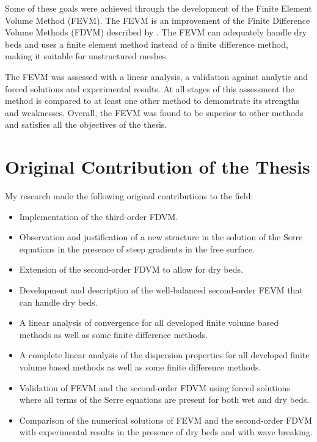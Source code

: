 Some of these goals were achieved through the development of the Finite Element Volume Method (FEVM). The FEVM is an improvement of the Finite Difference Volume Methods (FDVM) described by \citet{Zoppou-2014}. The FEVM can adequately handle dry beds and uses a finite element method instead of a finite difference method, making it suitable for unstructured meshes. 

The FEVM was assessed with a linear analysis, a validation against analytic and forced solutions and experimental results. At all stages of this assessment the method is compared to at least one other method to demonstrate its strengths and weaknesses. Overall, the FEVM was found to be superior to other methods and satisfies all the objectives of the thesis.

\section{Original Contribution of the Thesis}
My research made the following original contributions to the field:
\begin{itemize}
	\item Implementation of the third-order FDVM.
	\item Observation and justification of a new structure in the solution of the Serre equations in the presence of steep gradients in the free surface.
	\item Extension of the second-order FDVM to allow for dry beds.
	\item Development and description of the well-balanced second-order FEVM that can handle dry beds.
	\item A linear analysis of convergence for all developed finite volume based methods as well as some finite difference methods.
	\item A complete linear analysis of the dispersion properties for all developed finite volume based methods as well as some finite difference methods.
	\item Validation of FEVM and the second-order FDVM using forced solutions where all terms of the Serre equations are present for both wet and dry beds.
	\item Comparison of the numerical solutions of FEVM and the second-order FDVM with experimental results in the presence of dry beds and with wave breaking. 
\end{itemize}

